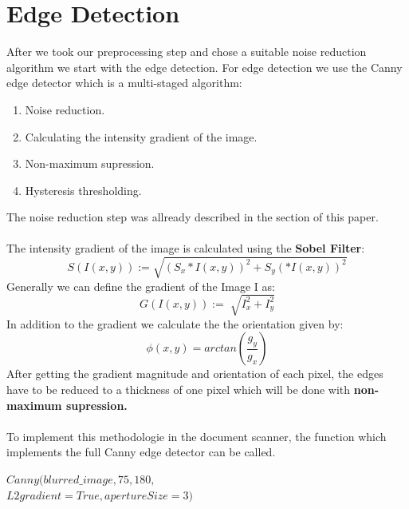\documentclass[twocolumn,10pt]{asme2ej}
\begin{document}

\section{Edge Detection}
\label{section:edgedetection}
\noindent
After we took our preprocessing step and chose a suitable noise reduction algorithm 
we start with the edge detection.
For edge detection we use the Canny edge\cite{canny_paper} detector which is a multi-staged algorithm:
\begin{enumerate}
    \item Noise reduction.
    \item Calculating the intensity gradient of the image.
    \item Non-maximum supression.
    \item Hysteresis thresholding.
\end{enumerate}
The noise reduction step was allready described in the  section of this paper.
\\\\
The intensity gradient of the image is calculated using the \textbf{Sobel Filter}:
\begin{equation}
    S(I(x,y)) :=\sqrt{(S_x*I(x,y))^2 + S_y(*I(x,y))^2}
\end{equation}
Generally we can define the gradient of the Image I as:
\begin{equation}
    G(I(x,y)) := \sqrt[]{I_x^2 +I_y^2}
\end{equation}
\noindent
In addition to the gradient we calculate the the orientation given by:
\begin{equation}
    \phi(x,y) = arctan(\frac{g_y}{g_x})
\end{equation}
After getting the gradient magnitude and orientation of each pixel, the edges have
to be reduced to a thickness of one pixel which will be done with \textbf{non-maximum supression.}
\\\\
\noindent
To implement this methodologie in the document scanner, the function
which implements the full Canny edge detector\cite{opencv_canny} can be called.
\begin{center}
    \noindent
    $Canny(blurred\_image,75, 180,$\\
    $L2gradient = True, apertureSize = 3)$
\end{center}
\end{document}
